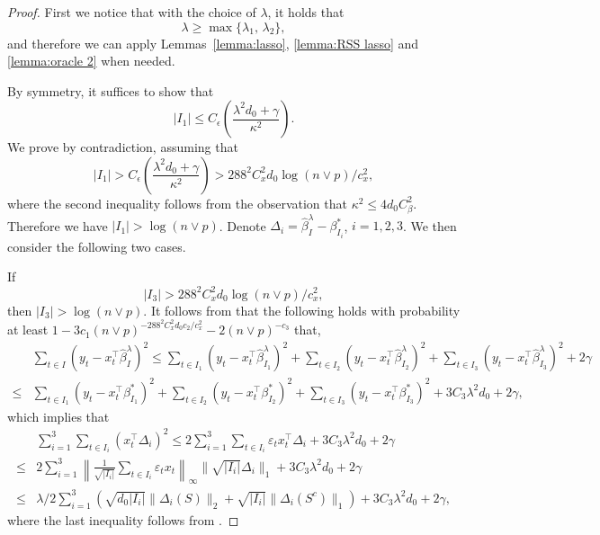 \documentclass[twoside]{article}
\begin{document}
\begin{proof} 
First we notice that with the choice of $\lambda$, it holds that 
	\[
		\lambda \geq \max\{\lambda_1, \, \lambda_2\},
	\]
	and therefore we can apply Lemmas~\ref{lemma:lasso}, \ref{lemma:RSS lasso} and \ref{lemma:oracle 2} when needed.

By symmetry, it suffices to show that
	\[
		|I_1| \leq C_{\epsilon} \left(\frac{\lambda^2 d_0 + \gamma}{\kappa^2}\right).
	\] 
	We prove by contradiction, assuming that
	\begin{equation}\label{eq-contra-2}
		|I_1| > C_{\epsilon} \left(\frac{\lambda^2 d_0 + \gamma}{\kappa^2} \right) > 288^2 C^2_x d_0 \log(n \vee p)/c_x^2,
	\end{equation}
	where the second inequality follows from the observation that $\kappa^2 \leq 4 d_0 C^2_{\beta}$.  Therefore we have $|I_1| > \log(n \vee p)$.  Denote $\Delta_i = \widehat \beta^\lambda_I  - \beta_{I_i}^*$, $i = 1, 2, 3$.  We then consider the following two cases.

\vskip 3mm
  If 
	\[
		|I_3| > 288^2 C^2_x d_0 \log(n \vee p)/c_x^2,
	\]
	then $|I_3| > \log(n \vee p)$.  It follows from  that the following holds with probability at least $1 - 3c_1 (n \vee p)^{-288^2C_x^2d_0c_2/c_x^2} - 2(n \vee p)^{-c_3}$ that,
	\begin{align}
		& \sum_{t\in I } (y_t -x_t^{\top} \widehat \beta^\lambda_ I )^2 \leq \sum_{t\in I_1 } (y_t -x_t^{\top} \widehat \beta^\lambda_ {I_1}  )^2 + \sum_{t\in I_2 } (y_t -x_t^{\top} \widehat \beta^\lambda_ {I_2}  )^2  + \sum_{t\in I_3} (y_t -x_t^{\top} \widehat \beta^\lambda_ {I_3}  )^2 + 2\gamma \nonumber \\
		\leq &  \sum_{t \in I_1 } (y_t -x_t^{\top}   \beta^* _ {I_1}  )^2 + \sum_{t \in I_2 } (y_t -x_t^{\top}   \beta^* _ {I_2}  )^2 + \sum_{t \in I_3 } (y_t -x_t^{\top}   \beta^* _ {I_3}  )^2 + 3C_3 \lambda^2 d_0 + 2\gamma,  \nonumber
	\end{align}
	which implies that 
	\begin{align}
	& \sum_{i=1}^3 \sum_{t\in I_i} (x_t^{\top}\Delta_i)^2 \leq 2 \sum_{i=1}^3 \sum_{t\in I_i} \varepsilon_t x_t^{\top} \Delta_i + 3C_3 \lambda^2 d_0 + 2\gamma \nonumber \\
	\leq & 2\sum_{i=1}^3 \left \| \frac{1}{\sqrt {|I_i| }} \sum_{t\in I_i } \varepsilon_t x_t  \right \|_{\infty } \| \sqrt { | I_i|}\Delta_i \|_1 + 3C_3 \lambda^2 d_0 + 2\gamma  \nonumber \\
   \le & \lambda/2 \sum_{i=1}^3 \left(  \sqrt {d_0 |I_i| }\|\Delta_i(S)\|_2  + \sqrt {|I_i| } \|\Delta_i(S^c) \|_1 \right) + 3C_3 \lambda^2 d_0 + 2\gamma,  \nonumber
	\end{align}
	where the last inequality follows from .
	

\end{proof}
\end{document}
